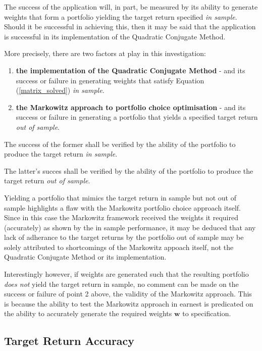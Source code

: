 \documentclass{article}
\begin{document}
The success of the application will, in part, be measured by its ability to generate weights that form a portfolio yielding the target return specified \textit{in sample}. Should it be successful in achieving this, then it may be said that the application is successful in its implementation of the Quadratic Conjugate Method. 



More precisely, there are two factors at play in this investigation: 


\begin{enumerate}
	\item \textbf{the implementation of the Quadratic Conjugate Method} - and its success or failure in generating weights that satisfy Equation (\ref{matrix_solved}) \textit{in sample}.
	
	\item \textbf{the Markowitz approach to portfolio choice optimisation} - and its success or failure in generating a portfolio that yields a specified target return \textit{out of sample}.
		
\end{enumerate}


The success of the former shall be verified by the ability of the portfolio to produce the target return \textit{in sample}.

The latter's succes shall be verified by the ability of the portfolio to produce the target return \textit{out of sample}.


Yielding a portfolio that mimics the target return in sample but not out of sample highlights a flaw with the Markowitz portfolio choice approach itself. Since in this case the Markowitz framework received the weights it required (accurately) as shown by the in sample performance, it may be deduced that any lack of adherance to the target returns by the portfolio out of sample may be solely attributed to shortcomings of the Markowitz appoach itself, not the Quadratic Conjugate Method or its implementation.

Interestingly however, if weights are generated such that the resulting portfolio \textit{does not} yield the target return in sample, no comment can be made on the success or failure of point 2 above, the validity of the Markowitz approach. This is because the ability to test the Markowitz approach in earnest is predicated on the ability to accurately generate the required weights $\textbf{w}$ to specification.


\subsection{Target Return Accuracy}
\end{document}
